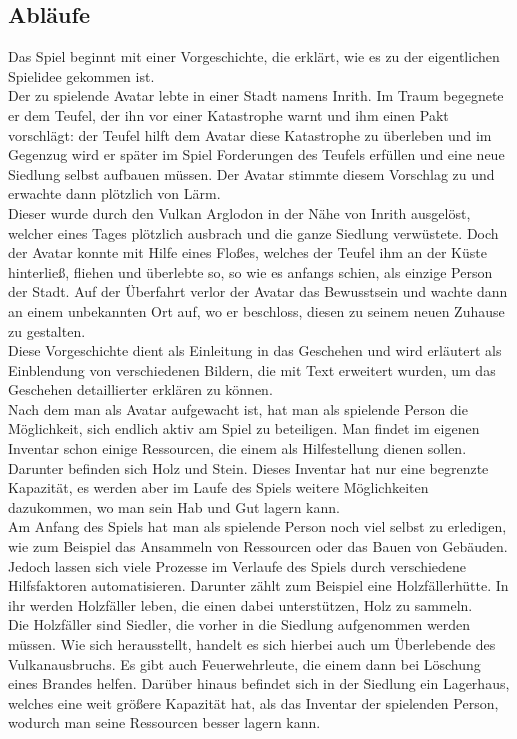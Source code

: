 \documentclass[paper=A4,pagesize=auto,12pt,headinclude=true,footinclude=true,BCOR=0mm,DIV=calc]{scrartcl}
\newcommand{\sectionspace}{
	\vspace{0.5cm}
}
\begin{document}
\sectionspace
\subsection{Abläufe}\label{sec:Ablaeufe}
Das Spiel beginnt mit einer Vorgeschichte, die erklärt, wie es zu der eigentlichen Spielidee gekommen ist. \\
Der zu spielende Avatar lebte in einer Stadt namens Inrith. Im Traum begegnete er dem Teufel, der ihn vor einer Katastrophe warnt und ihm einen Pakt vorschlägt: der Teufel hilft dem Avatar diese Katastrophe zu überleben und im Gegenzug wird er später im Spiel Forderungen des Teufels erfüllen und eine neue Siedlung selbst aufbauen müssen. Der Avatar stimmte diesem Vorschlag zu und erwachte dann plötzlich von Lärm. \\
Dieser wurde durch den Vulkan Arglodon in der Nähe von Inrith ausgelöst, welcher eines Tages plötzlich ausbrach und die ganze Siedlung verwüstete. Doch der Avatar konnte mit Hilfe eines Floßes, welches der Teufel ihm an der Küste hinterließ, fliehen und überlebte so, so wie es anfangs schien, als einzige Person der Stadt. Auf der Überfahrt verlor der Avatar das Bewusstsein und wachte dann an einem unbekannten Ort auf, wo er beschloss, diesen zu seinem neuen Zuhause zu gestalten. \\
Diese Vorgeschichte dient als Einleitung in das Geschehen und wird erläutert als Einblendung von verschiedenen Bildern, die mit Text erweitert wurden, um das Geschehen detaillierter erklären zu können. \\
Nach dem man als Avatar aufgewacht ist, hat man als spielende Person die Möglichkeit, sich endlich aktiv am Spiel zu beteiligen. Man findet im eigenen Inventar schon einige Ressourcen, die einem als Hilfestellung dienen sollen. Darunter befinden sich Holz und Stein. Dieses Inventar hat nur eine begrenzte Kapazität, es werden aber im Laufe des Spiels weitere Möglichkeiten dazukommen, wo man sein Hab und Gut lagern kann.\\
Am Anfang des Spiels hat man als spielende Person noch viel selbst zu erledigen, wie zum Beispiel das Ansammeln von Ressourcen oder das Bauen von Gebäuden. Jedoch lassen sich viele Prozesse im Verlaufe des Spiels durch verschiedene Hilfsfaktoren automatisieren. Darunter zählt zum Beispiel eine Holzfällerhütte. In ihr werden Holzfäller leben, die einen dabei unterstützen, Holz zu sammeln. \\
Die Holzfäller sind Siedler, die vorher in die Siedlung aufgenommen werden müssen. Wie sich herausstellt, handelt es sich hierbei auch um Überlebende des Vulkanausbruchs. Es gibt auch Feuerwehrleute, die einem dann bei Löschung eines Brandes helfen. Darüber hinaus befindet sich in der Siedlung ein Lagerhaus, welches eine weit größere Kapazität hat, als das Inventar der spielenden Person, wodurch man seine Ressourcen besser lagern kann. \\
\end{document}
